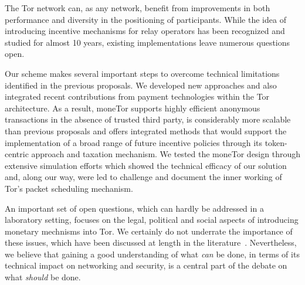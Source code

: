 
The Tor network can, as any network, benefit from improvements in both
performance and diversity in the positioning of participants. While the idea of
introducing incentive mechanisms for relay operators has been recognized and
studied for almost 10 years, existing implementations leave numerous questions
open.

Our scheme makes several important steps to overcome technical limitations
identified in the previous proposals. We developed new approaches and also
integrated recent contributions from payment technologies within the Tor
architecture. As a result, moneTor supports highly efficient anonymous
transactions in the absence of trusted third party, is considerably more
scalable than previous proposals and offers integrated methods that would
support the implementation of a broad range of future incentive policies through
its token-centric approach and taxation mechanism. We tested the moneTor design
through extensive simulation efforts which showed the technical efficacy of our
solution and, along our way, were led to challenge and document the inner
working of Tor's packet scheduling mechanism.

An important set of open questions, which can hardly be addressed in a
laboratory setting, focuses on the legal, political and social aspects of
introducing monetary mechnisms into Tor. We certainly do not underrate the
importance of these issues, which have been discussed at length in the
literature~\cite{jansenblogpost}. Nevertheless, we believe that gaining a good
understanding of what \emph{can} be done, in terms of its technical impact on
networking and security, is a central part of the debate on what \emph{should}
be done.




